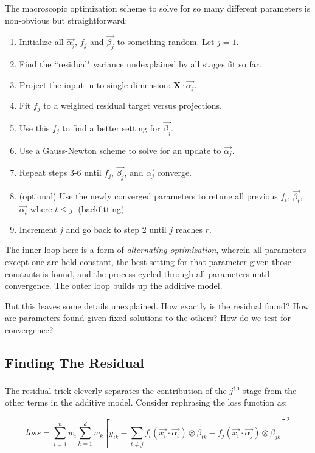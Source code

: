 \documentclass[12pt]{article}
\begin{document}
The macroscopic optimization scheme to solve for so many different parameters is non-obvious but straightforward:
\begin{enumerate}
	\setlength\itemsep{-2mm}
	\item Initialize all $\vec{\alpha_j}$, $f_j$ and $\vec{\beta_j}$ to something random. Let $j=1$. 
	\item Find the ``residual" variance undexplained by all stages fit so far.
	\item Project the input in to single dimension: $\pmb{X} \cdot \vec{\alpha_j}$.
	\item Fit $f_j$ to a weighted residual target versus projections.
	\item Use this $f_j$ to find a better setting for $\vec{\beta_j}$.
	\item Use a Gauss-Newton scheme to solve for an update to $\vec{\alpha_j}$.
	\item Repeat steps 3-6 until $f_j$, $\vec{\beta_j}$, and $\vec{\alpha_j}$ converge.
	\item (optional) Use the newly converged parameters to retune all previous $f_t$, $\vec{\beta_t}$, $\vec{\alpha_t}$ where $t \leq j$. (backfitting)
	\item Increment $j$ and go back to step 2 until $j$ reaches $r$.
\end{enumerate}

The inner loop here is a form of \textit{alternating optimization}, wherein all parameters except one are held constant, the best setting for that parameter given those constants is found, and the process cycled through all parameters until convergence. The outer loop builds up the additive model.

But this leaves some details unexplained. How exactly is the residual found? How are parameters found given fixed solutions to the others? How do we test for convergence?

\subsection{Finding The Residual}

The residual trick cleverly separates the contribution of the $j$\textsuperscript{th} stage from the other terms in the additive model. Consider rephrasing the loss function as:

$$loss = \sum_{i=1}^n w_i \sum_{k=1}^d w_k [y_{ik} - \sum_{t \neq j} f_t(\vec{x_i} \cdot \vec{\alpha_t}) \otimes \beta_{tk} - f_j(\vec{x_i} \cdot \vec{\alpha_j}) \otimes \beta_{jk}]^2$$
\end{document}
